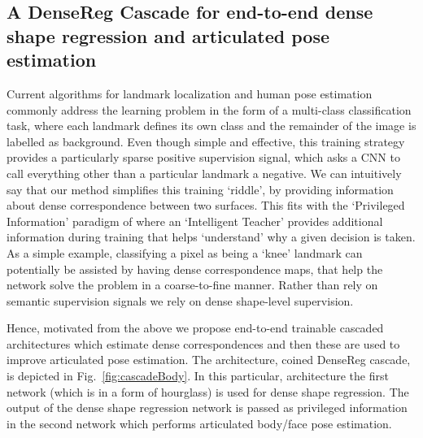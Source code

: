 \subsection{A DenseReg Cascade for end-to-end dense shape regression and articulated pose estimation}
\label{sec: densereg_cascade}

Current algorithms for landmark localization and human pose estimation commonly address the learning problem in the form of a multi-class classification task, where each landmark defines its own class and the remainder of the image is labelled as background. Even though simple and effective, this training strategy provides a particularly sparse positive supervision signal, which asks a CNN to call everything other than a particular landmark a negative. We can intuitively say that our method simplifies this training `riddle', by providing information about dense correspondence between two surfaces. This fits  with the `Privileged Information' paradigm of  \cite{VapnikV09} where an `Intelligent Teacher' provides additional information during training that helps `understand' why a given  decision is taken. As a simple example, classifying a pixel as being a `knee' landmark can potentially be assisted by having dense correspondence maps, that  help the network solve the problem in a coarse-to-fine manner. Rather than rely on semantic supervision signals  we  rely on dense shape-level supervision.
    
Hence, motivated from the above we propose end-to-end trainable cascaded architectures which estimate dense correspondences and then these are used to improve articulated pose estimation. The architecture, coined DenseReg cascade, is depicted in Fig.~\ref{fig:cascadeBody}. In this particular, architecture the first network (which is in a form of hourglass) is used for dense shape regression. The output of the dense shape regression network is passed as privileged information in the second network which performs articulated body/face pose estimation. 


